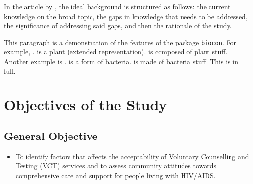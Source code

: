 \documentclass{strrespaper-trad}
\begin{document}
			In the article  by \citeauthor{sachdevHowWriteBackground2018}, the ideal background is structured as follows: the current knowledge on the broad topic, the gaps in knowledge that needs to be addressed, the significance of addressing said gaps, and then the rationale of the study.

			This paragraph is a demonstration of the features of the package \texttt{biocon}. For example, .
			 is a plant (extended representation).
			 is composed of plant stuff.
			Another example is .
			 is a form of bacteria.
			 is made of bacteria stuff.
			This is  in full.

			\Blindtext[2]

		\section{Objectives of the Study}
			\nocite{theopenuniversityHealthManagementEthics2017}
			\subsection{General Objective}
				\begin{itemize}
					\item To identify factors that affects the acceptability of Voluntary Counselling and Testing (VCT) services and to assess community attitudes towards comprehensive care and support for people living with HIV/AIDS.
				\end{itemize}
\end{document}
